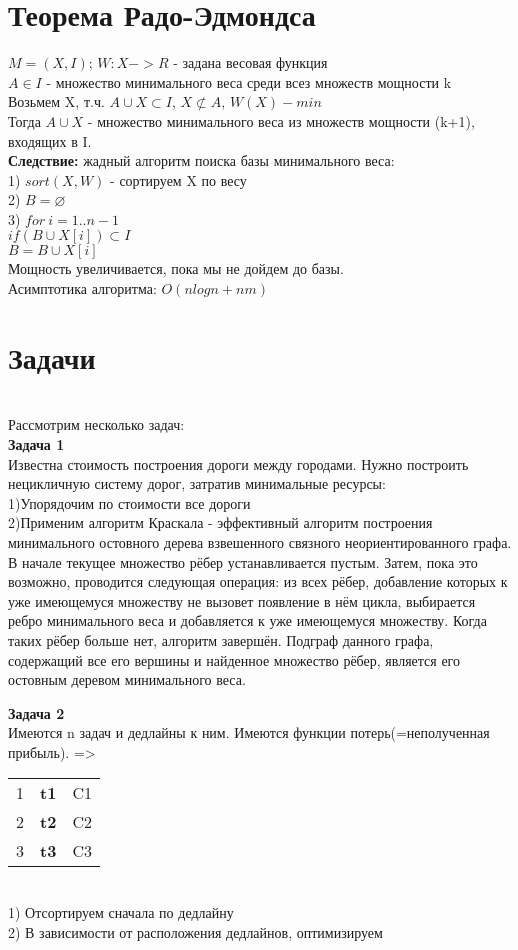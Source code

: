 \documentclass[a4paper,12pt]{article}
\begin{document}
\section{Теорема Радо-Эдмондса}
$M=(X,I)$; $W:X->R$ - задана весовая функция\\
$A\in I$ - множество минимального веса среди всез множеств мощности k\\
Возьмем X, т.ч.  $A\cup X \subset I$, $X \not \subset A$, $W(X)-min$\\
Тогда  $A\cup X$ - множество минимального веса из множеств мощности (k+1), входящих в I.\\
 \textbf{Следствие:} жадный алгоритм поиска базы минимального веса:\\
 1) $sort (X,W)$ - сортируем X по весу\\
 2) $B= \varnothing $\\
 3) $for \: i=1..n-1$\\
 $if (B\cup X[i]) \subset I$\\
 $B=B\cup {X[i]}$\\
 Мощность увеличивается, пока мы не дойдем до базы.\\
 Асимптотика алгоритма: $O(nlogn+nm)$\\
 
 \section {Задачи}
\\Рассмотрим несколько задач: \\

\textbf{Задача 1}\\
Известна стоимость построения дороги между городами. Нужно построить нецикличную систему дорог, затратив минимальные ресурсы:\\
1)Упорядочим по стоимости все дороги\\
2)Применим алгоритм Краскала - эффективный алгоритм построения минимального остовного дерева взвешенного связного неориентированного графа. \\
В начале текущее множество рёбер устанавливается пустым. Затем, пока это возможно, проводится следующая операция: из всех рёбер, добавление которых к уже имеющемуся множеству не вызовет появление в нём цикла, выбирается ребро минимального веса и добавляется к уже имеющемуся множеству. Когда таких рёбер больше нет, алгоритм завершён. Подграф данного графа, содержащий все его вершины и найденное множество рёбер, является его остовным деревом минимального веса.


\textbf{Задача 2}\\
Имеются n задач и дедлайны к ним. Имеются функции потерь(=неполученная прибыль). =>
\begin{tabular}{ccc}
1 & \textbf{t1} & C1 \\
2 & \textbf{t2} & C2 \\
3 & \textbf{t3}& C3 \\
\end{tabular}\\
1) Отсортируем сначала по дедлайну\\
2) В зависимости от расположения дедлайнов, оптимизируем\\
 
 
\end{document}
